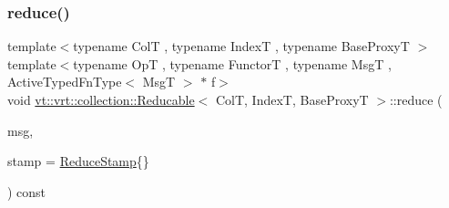 \mbox{\label{structvt_1_1vrt_1_1collection_1_1_reducable_a627f3a970578d49ee53b6afe5a6f02b2}} 
\subsubsection{\texorpdfstring{reduce()}{reduce()}\hspace{0.1cm}{\footnotesize\ttfamily [2/4]}}
{\footnotesize\ttfamily template$<$typename ColT , typename IndexT , typename Base\+ProxyT $>$ \\
template$<$typename OpT , typename FunctorT , typename MsgT , Active\+Typed\+Fn\+Type$<$ Msg\+T $>$ $\ast$ f$>$ \\
void \hyperlink{structvt_1_1vrt_1_1collection_1_1_reducable}{vt\+::vrt\+::collection\+::\+Reducable}$<$ ColT, IndexT, Base\+ProxyT $>$\+::reduce (\begin{DoxyParamCaption}\item[{MsgT $\ast$const}]{msg,  }\item[{\hyperlink{structvt_1_1vrt_1_1collection_1_1_reducable_a19f80baf23f36dad4948ef07322fd0cb}{Reduce\+Stamp}}]{stamp = {\ttfamily \hyperlink{structvt_1_1vrt_1_1collection_1_1_reducable_a19f80baf23f36dad4948ef07322fd0cb}{Reduce\+Stamp}\{\}} }\end{DoxyParamCaption}) const}

\mbox{\label{structvt_1_1vrt_1_1collection_1_1_reducable_a12424df1d19193eb084e5ee2686502a2}} 
